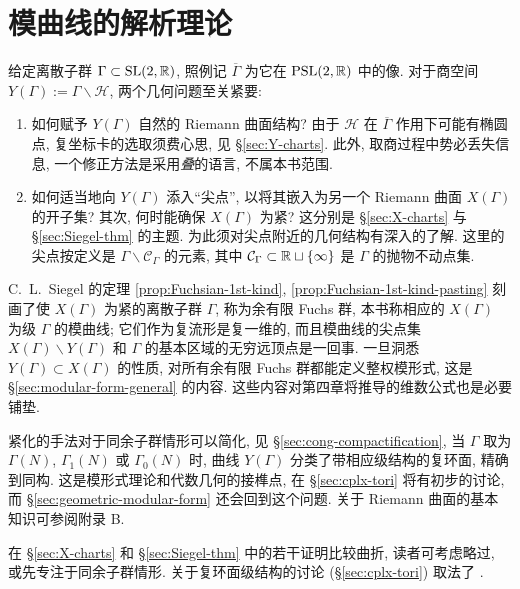 
\chapter{模曲线的解析理论}
给定离散子群 $\Gamma \subset \operatorname{SL}(2,\mathbb{R})$, 照例记 $\overline{\Gamma}$ 为它在 $\operatorname{PSL}(2,\mathbb{R})$ 中的像. 对于商空间 $Y(\Gamma) := \Gamma \backslash \mathcal{H}$, 两个几何问题至关紧要:
\begin{enumerate}
	\item 如何赋予 $Y(\Gamma)$ 自然的 Riemann 曲面结构? 由于 $\mathcal{H}$ 在 $\overline{\Gamma}$ 作用下可能有椭圆点, 复坐标卡的选取须费心思, 见 \S\ref{sec:Y-charts}. 此外, 取商过程中势必丢失信息, 一个修正方法是采用\emph{叠}的语言, 不属本书范围.
	\item 如何适当地向 $Y(\Gamma)$ 添入``尖点'', 以将其嵌入为另一个 Riemann 曲面 $X(\Gamma)$ 的开子集? 其次, 何时能确保 $X(\Gamma)$ 为紧? 这分别是 \S\ref{sec:X-charts} 与 \S\ref{sec:Siegel-thm} 的主题. 为此须对尖点附近的几何结构有深入的了解. 这里的尖点按定义是 $\Gamma \backslash \mathcal{C}_\Gamma$ 的元素, 其中 $\mathcal{C}_\Gamma \subset \mathbb{R} \sqcup \{\infty\}$ 是 $\Gamma$ 的抛物不动点集.
\end{enumerate}

C.\ L.\ Siegel 的定理 \ref{prop:Fuchsian-1st-kind}, \ref{prop:Fuchsian-1st-kind-pasting} 刻画了使 $X(\Gamma)$ 为紧的离散子群 $\Gamma$, 称为余有限 Fuchs 群, 本书称相应的 $X(\Gamma)$ 为级 $\Gamma$ 的模曲线; 它们作为复流形是复一维的, 而且模曲线的尖点集 $X(\Gamma) \smallsetminus Y(\Gamma)$ 和 $\Gamma$ 的基本区域的无穷远顶点是一回事. 一旦洞悉 $Y(\Gamma) \subset X(\Gamma)$ 的性质, 对所有余有限 Fuchs 群都能定义整权模形式, 这是 \S\ref{sec:modular-form-general} 的内容. 这些内容对第四章将推导的维数公式也是必要铺垫.

紧化的手法对于同余子群情形可以简化, 见 \S\ref{sec:cong-compactification}, 当 $\Gamma$ 取为 $\Gamma(N)$, $\Gamma_1(N)$ 或 $\Gamma_0(N)$ 时, 曲线 $Y(\Gamma)$ 分类了带相应级结构的复环面, 精确到同构. 这是模形式理论和代数几何的接榫点, 在 \S\ref{sec:cplx-tori} 将有初步的讨论, 而 \S\ref{sec:geometric-modular-form} 还会回到这个问题. 关于 Riemann 曲面的基本知识可参阅附录 B.

在 \S\ref{sec:X-charts} 和 \S\ref{sec:Siegel-thm} 中的若干证明比较曲折, 读者可考虑略过, 或先专注于同余子群情形. 关于复环面级结构的讨论 (\S\ref{sec:cplx-tori}) 取法了 \cite{Del71}.

